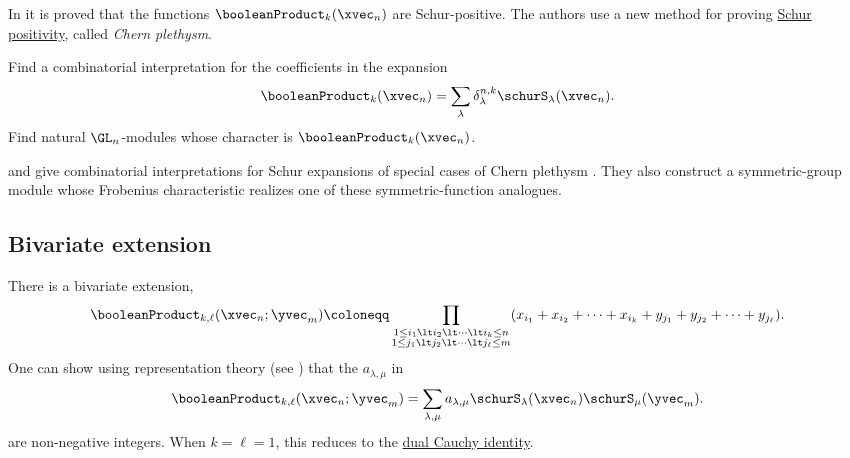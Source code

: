 In \cite{BilleyRhoadesTewari2019} it is proved that the 
functions $\booleanProduct_{k}(\xvec_n)$ are Schur-positive.
The authors use a new method for proving \hyperref[schurPositivity]{Schur positivity}, called \emph{Chern plethysm}.

\begin{problem}
Find a combinatorial interpretation for the coefficients in the expansion
\[
\booleanProduct_{k}(\xvec_n) = \sum_{\lambda} \delta^{n,k}_{\lambda} \schurS_\lambda(\xvec_n).
\]
Find natural $\GL_n$-modules whose character
is $\booleanProduct_{k}(\xvec_n)$.
\end{problem}

 and  give combinatorial
interpretations for Schur expansions of special cases of Chern plethysm
\cite{LibmanOrelowitz2023x}.  They also construct a symmetric-group module
whose Frobenius characteristic realizes one of these symmetric-function
analogues.

\subsection[booleanProductBivariate]{Bivariate extension}

There is a bivariate extension,
\[
\booleanProduct_{k,\ell}(\xvec_n;\yvec_m) 
 \coloneqq 
\prod_{ \substack{ 1 \leq i_1 \lt i_2 \lt \dotsb \lt i_k \leq n 
\\
1 \leq j_1 \lt j_2 \lt \dotsb \lt j_\ell \leq m
}}
(x_{i_1} + x_{i_2}+\dotsb + x_{i_k} + 
 y_{j_1} + y_{j_2}+\dotsb + y_{j_\ell}
).
\]
One can show using representation theory (see \cite{BilleyRhoadesTewari2019}) 
that the $a_{\lambda,\mu}$ in 
\[
\booleanProduct_{k,\ell}(\xvec_n;\yvec_m) = \sum_{\lambda,\mu} a_{\lambda,\mu} \schurS_\lambda(\xvec_n)\schurS_\mu(\yvec_m).
\]
are non-negative integers. When $k=\ell = 1$, this reduces 
to the \hyperref[schurCauchyFormula]{dual Cauchy identity}.
